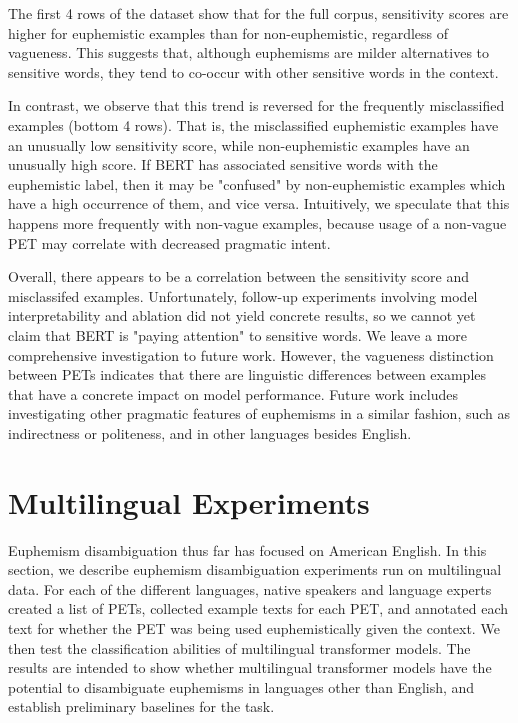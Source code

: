 \documentclass[11pt]{article}
\begin{document}
The first 4 rows of the dataset show that for the full corpus, sensitivity scores are higher for euphemistic examples than for non-euphemistic, regardless of vagueness. This suggests that, although euphemisms are milder alternatives to sensitive words, they tend to co-occur with other sensitive words in the context. 

In contrast, we observe that this trend is reversed for the frequently misclassified examples (bottom 4 rows). That is, the misclassified euphemistic examples have an unusually low sensitivity score, while non-euphemistic examples have an unusually high score. If BERT has associated sensitive words with the euphemistic label, then it may be "confused" by non-euphemistic examples which have a high occurrence of them, and vice versa. Intuitively, we speculate that this happens more frequently with non-vague examples, because usage of a non-vague PET may correlate with decreased pragmatic intent.

Overall, there appears to be a correlation between the sensitivity score and misclassifed examples. Unfortunately, follow-up experiments involving model interpretability and ablation did not yield concrete results, so we cannot yet claim that BERT is "paying attention" to sensitive words. We leave a more comprehensive investigation to future work. However, the vagueness distinction between PETs indicates that there are linguistic differences between examples that have a concrete impact on model performance. Future work includes investigating other pragmatic features of euphemisms in a similar fashion, such as indirectness or politeness, and in other languages besides English.

\section{Multilingual Experiments}

Euphemism disambiguation thus far has focused on American English. In this section, we describe euphemism disambiguation experiments run on multilingual data. For each of the different languages, native speakers and language experts created a list of PETs, collected example texts for each PET, and annotated each text for whether the PET was being used euphemistically given the context. We then test the classification abilities of multilingual transformer models. The results are intended to show whether multilingual transformer models have the potential to disambiguate euphemisms in languages other than English, and establish preliminary baselines for the task.
\end{document}
